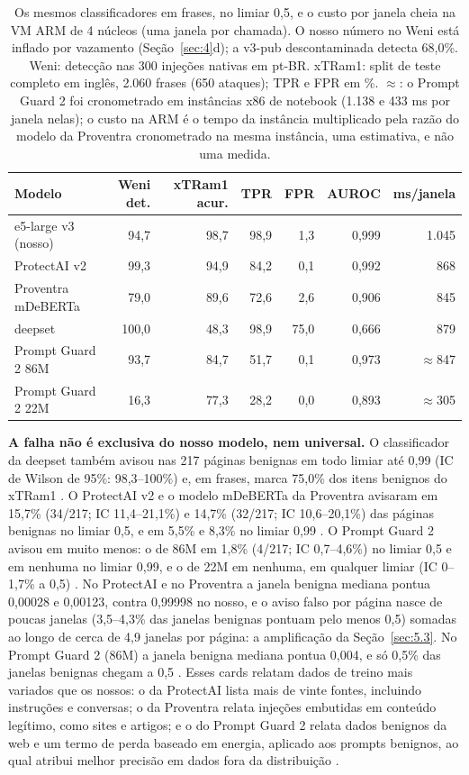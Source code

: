 \documentclass[11pt]{article}
\begin{document}
\begin{table}[tbp]
\centering
\small
\caption{Os mesmos classificadores em frases, no limiar 0,5, e o custo por janela cheia na VM ARM de 4 núcleos (uma janela por chamada). O nosso número no Weni está inflado por vazamento (Seção~\ref{sec:4}d); a v3-pub descontaminada detecta 68,0\%. Weni: detecção nas 300 injeções nativas em pt-BR. xTRam1: split de teste completo em inglês, 2.060 frases (650 ataques); TPR e FPR em \%. \ensuremath{\approx}: o Prompt Guard 2 foi cronometrado em instâncias x86 de notebook (1.138 e 433 ms por janela nelas); o custo na ARM é o tempo da instância multiplicado pela razão do modelo da Proventra cronometrado na mesma instância, uma estimativa, e não uma medida.}\label{tab:9}
\begin{tabular}{@{}lrrrrrr@{}}
\toprule
Modelo & Weni det. & xTRam1 acur. & TPR & FPR & AUROC & ms/janela \\
\midrule
e5-large v3 (nosso) & 94,7 & 98,7 & 98,9 & 1,3 & 0,999 & 1.045 \\
ProtectAI v2 & 99,3 & 94,9 & 84,2 & 0,1 & 0,992 & 868 \\
Proventra mDeBERTa & 79,0 & 89,6 & 72,6 & 2,6 & 0,906 & 845 \\
deepset & 100,0 & 48,3 & 98,9 & 75,0 & 0,666 & 879 %
 \\
Prompt Guard 2 86M & 93,7 & 84,7 & 51,7 & 0,1 & 0,973 & \ensuremath{\approx}847 \\
Prompt Guard 2 22M & 16,3 & 77,3 & 28,2 & 0,0 & 0,893 & \ensuremath{\approx}305 %
 \\
\bottomrule
\end{tabular}
\end{table}

\textbf{A falha não é exclusiva do nosso modelo, nem universal.} O classificador da deepset também avisou nas 217 páginas benignas em todo limiar até 0,99 (IC de Wilson de 95\%: 98,3–100\%) e, em frases, marca 75,0\% dos itens benignos do xTRam1%
. O ProtectAI v2 e o modelo mDeBERTa da Proventra avisaram em 15,7\% (34/217; IC 11,4–21,1\%) e 14,7\% (32/217; IC 10,6–20,1\%) das páginas benignas no limiar 0,5, e em 5,5\% e 8,3\% no limiar 0,99%
. O Prompt Guard 2 avisou em muito menos: o de 86M em 1,8\% (4/217; IC 0,7–4,6\%) no limiar 0,5 e em nenhuma no limiar 0,99, e o de 22M em nenhuma, em qualquer limiar (IC 0–1,7\% a 0,5)%
. No ProtectAI e no Proventra a janela benigna mediana pontua 0,00028 e 0,00123, contra 0,99998 no nosso, e o aviso falso por página nasce de poucas janelas (3,5–4,3\% das janelas benignas pontuam pelo menos 0,5) somadas ao longo de cerca de 4,9 janelas por página: a amplificação da Seção~\ref{sec:5.3}. No Prompt Guard 2 (86M) a janela benigna mediana pontua 0,004, e só 0,5\% das janelas benignas chegam a 0,5%
. Esses cards relatam dados de treino mais variados que os nossos: o da ProtectAI lista mais de vinte fontes, incluindo instruções e conversas; o da Proventra relata injeções embutidas em conteúdo legítimo, como sites e artigos; e o do Prompt Guard 2 relata dados benignos da web e um termo de perda baseado em energia, aplicado aos prompts benignos, ao qual atribui melhor precisão em dados fora da distribuição%
.
\end{document}
